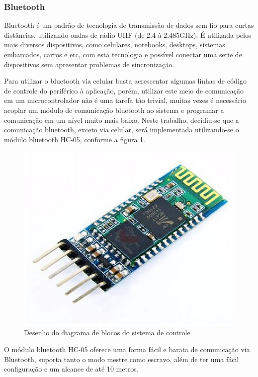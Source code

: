 \subsubsection{Bluetooth}

Bluetooth é um padrão de tecnologia de transmissão de dados sem fio para curtas distâncias, utilizando ondas de rádio UHF (de 2.4 à 2.485GHz). É utilizada pelos mais diversos dispositivos, como celulares, notebooks, desktops, sistemas embarcados, carros e etc, com esta tecnologia e possível conectar uma serie de dispositivos sem apresentar problemas de sincronização.

Para utilizar o bluetooth via celular basta acrescentar algumas linhas de código de controle do periférico à aplicação, porém, utilizar este meio de comunicação em um microcontrolador não é uma tarefa tão trivial, muitas vezes é necessário acoplar um módulo de comunicação bluetooth ao sistema e programar a comunicação em um nível muito mais baixo. Neste trabalho, decidiu-se que a comunicação bluetooth, exceto via celular, será implementada utilizando-se o módulo bluetooth HC-05, conforme a figura \ref{fig:bluetooth}.

\begin{figure}[!htb]
\centering
  \includegraphics[keepaspectratio=true,scale=0.5]{figuras/controle/bluetooth}
\caption{Desenho do diagrama de blocos do sistema de controle}
\label{fig:bluetooth}
\end{figure}

O módulo bluetooth HC-05 oferece uma forma fácil e barata de comunicação via Bluetooth, suporta tanto o modo mestre como escravo, além de ter uma fácil configuração e um alcance de até 10 metros.

